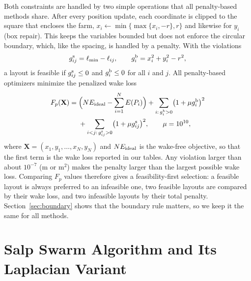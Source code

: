 \documentclass[journal,twoside]{IEEEtran}
\begin{document}
Both constraints are handled by two simple operations that all penalty-based methods share. After every position update, each coordinate is clipped to the square that encloses the farm, $x_i\leftarrow\min\{\max\{x_i,-r\},r\}$ and likewise for $y_i$ (box repair). This keeps the variables bounded but does not enforce the circular boundary, which, like the spacing, is handled by a penalty. With the violations
\begin{equation}
g^{\rm s}_{ij}=\ell_{\min}-\ell_{ij},\qquad g^{\rm b}_{i}=x_i^2+y_i^2-r^2,
\label{eq:spacingviolation}
\end{equation}
a layout is feasible if $g^{\rm s}_{ij}\le0$ and $g^{\rm b}_i\le0$ for all $i$ and $j$. All penalty-based optimizers minimize the penalized wake loss
\begin{equation}
\begin{split}
F_p(\mathbf X)={}&\Bigl(N E_{\rm ideal}-\sum_{i=1}^{N}E(P_i)\Bigr)+\sum_{i:\,g^{\rm b}_i>0}\bigl(1+\mu g^{\rm b}_i\bigr)^2\\
&+\sum_{i<j:\,g^{\rm s}_{ij}>0}\bigl(1+\mu g^{\rm s}_{ij}\bigr)^2,\qquad \mu=10^{10},
\end{split}
\label{eq:penalty}
\end{equation}
where $\mathbf X=(x_1,y_1,\ldots,x_N,y_N)$ and $N E_{\rm ideal}$ is the wake-free objective, so that the first term is the wake loss reported in our tables. Any violation larger than about $10^{-7}$ (m or m$^2$) makes the penalty larger than the largest possible wake loss. Comparing $F_p$ values therefore gives a feasibility-first selection: a feasible layout is always preferred to an infeasible one, two feasible layouts are compared by their wake loss, and two infeasible layouts by their total penalty. Section~\ref{sec:boundary} shows that the boundary rule matters, so we keep it the same for all methods.

\section{Salp Swarm Algorithm and Its Laplacian Variant}
\label{sec:ssa}
\end{document}
